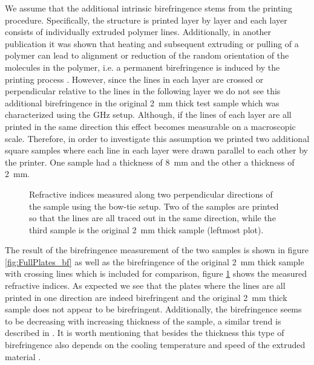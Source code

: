 We assume that the additional intrinsic birefringence stems from the printing procedure.
Specifically, the structure is printed layer by layer and each layer consists of individually extruded polymer lines. Additionally, in another publication it was shown that heating and subsequent extruding or pulling of a polymer can lead to alignment or reduction of the random orientation of the molecules in the polymer, i.e. a permanent birefringence is induced by the printing process \cite{Solr-urn:nbn:de:hebis:04-z2017-0786}. However, since the lines in each layer are crossed or perpendicular relative to the lines in the following layer we do not see this additional birefringence in the original \SI{2}{\milli \meter} thick test sample which was characterized using the GHz setup. Although, if the lines of each layer are all printed in the same direction this effect becomes measurable on a macroscopic scale. Therefore, in order to investigate this assumption we printed two additional square samples where each line in each layer were drawn parallel to each other by the printer. One sample had a thickness of \SI{8}{\milli \meter} and the other a thickness of \SI{2}{\milli \meter}. 

\begin{figure}[H]
    \centering
    
    \caption{Refractive indices measured along two perpendicular directions of the sample using the bow-tie setup. Two of the samples are printed so that the lines are all traced out in the same direction, while the third sample is the original \SI{2}{\milli \meter} thick sample (leftmost plot).}
    \label{fig:ri_fullplates}
\end{figure}

The result of the birefringence measurement of the two samples is shown in figure \ref{fig:FullPlates_bf} as well as the birefringence of the original \SI{2}{\milli \meter} thick sample with crossing lines which is included for comparison, figure \ref{fig:ri_fullplates} shows the measured refractive indices. As expected we see that the plates where the lines are all printed in one direction are indeed birefringent and the original \SI{2}{\milli \meter} thick sample does not appear to be birefringent. Additionally, the birefringence seems to be decreasing with increasing thickness of the sample, a similar trend is described in \cite{Solr-urn:nbn:de:hebis:04-z2017-0786}. It is worth mentioning that besides the thickness this type of birefringence also depends on the cooling temperature and speed of the extruded material \cite{Solr-urn:nbn:de:hebis:04-z2017-0786}.

